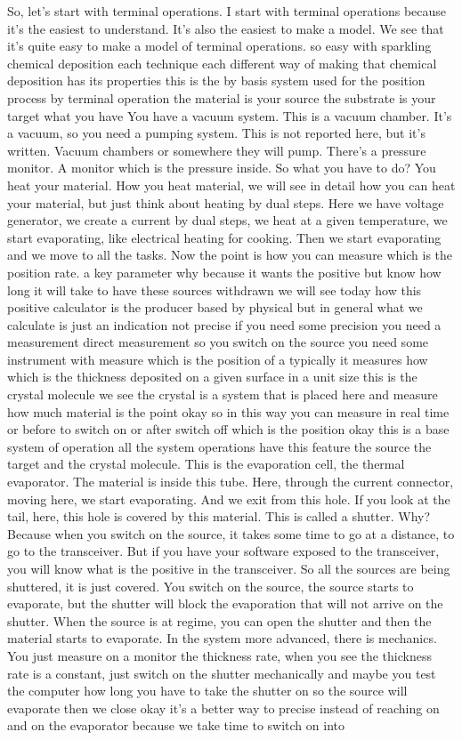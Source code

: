 So, let's start with terminal operations. I start with terminal operations because it's the easiest to understand. It's also the easiest to make a model. We see that it's quite easy to make a model of terminal operations. so easy with sparkling chemical deposition each technique each different way of making that chemical deposition has its properties this is the by basis system used for the position process by terminal operation the material is your source the substrate is your target what you have You have a vacuum system. This is a vacuum chamber. It's a vacuum, so you need a pumping system. This is not reported here, but it's written. Vacuum chambers or somewhere they will pump. There's a pressure monitor. A monitor which is the pressure inside. So what you have to do? You heat your material. How you heat material, we will see in detail how you can heat your material, but just think about heating by dual steps. Here we have voltage generator, we create a current by dual steps, we heat at a given temperature, we start evaporating, like electrical heating for cooking. Then we start evaporating and we move to all the tasks. Now the point is how you can measure which is the position rate. a key parameter why because it wants the positive but know how long it will take to have these sources withdrawn we will see today how this positive calculator is the producer based by physical but in general what we calculate is just an indication not precise if you need some precision you need a measurement direct measurement so you switch on the source you need some instrument with measure which is the position of a typically it measures how which is the thickness deposited on a given surface in a unit size this is the crystal molecule we see the crystal is a system that is placed here and measure how much material is the point okay so in this way you can measure in real time or before to switch on or after switch off which is the position okay this is a base system of operation all the system operations have this feature the source the target and the crystal molecule. This is the evaporation cell, the thermal evaporator. The material is inside this tube. Here, through the current connector, moving here, we start evaporating. And we exit from this hole. If you look at the tail, here, this hole is covered by this material. This is called a shutter. Why? Because when you switch on the source, it takes some time to go at a distance, to go to the transceiver. But if you have your software exposed to the transceiver, you will know what is the positive in the transceiver. So all the sources are being shuttered, it is just covered. You switch on the source, the source starts to evaporate, but the shutter will block the evaporation that will not arrive on the shutter. When the source is at regime, you can open the shutter and then the material starts to evaporate. In the system more advanced, there is mechanics. You just measure on a monitor the thickness rate, when you see the thickness rate is a constant, just switch on the shutter mechanically and maybe you test the computer how long you have to take the shutter on so the source will evaporate then we close okay it's a better way to precise instead of reaching on and on the evaporator because we take time to switch on into 